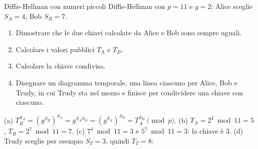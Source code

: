 \begin{esercizio}{Diffie-Hellman con numeri piccoli}
Diffie-Hellman con $p = 11$ e $g = 2$; Alice sceglie $S_A = 4$, Bob $S_B = 7$.
\begin{enumerate}[label=(\alph*)]
    \item Dimostrare che le due chiavi calcolate da Alice e Bob sono sempre uguali.
    \item Calcolare i valori pubblici $T_A$ e $T_B$.
    \item Calcolare la chiave condivisa.
    \item Disegnare un diagramma temporale, una linea ciascuno per Alice, Bob e Trudy, in cui Trudy sta nel mezzo e finisce per condividere
          una chiave con ciascuno.
\end{enumerate}

\svolgimento
(a) $T_B^{S_A} = (g^{S_B})^{S_A} = g^{S_A S_B} = (g^{S_A})^{S_B} = T_A^{S_B} \pmod p$. (b) $T_A = 2^4 \bmod 11 = 5$, $T_B = 2^7 \bmod 11 =
7$. (c) $7^4 \bmod 11 = 3$ e $5^7 \bmod 11 = 3$: la chiave è 3. (d) Trudy sceglie per esempio $S_T = 3$, quindi $T_T = 8$:
\begin{center}
\end{center}
\end{esercizio}


